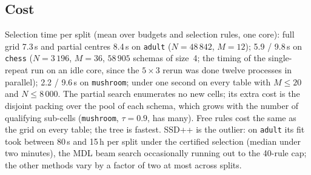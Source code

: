\documentclass[11pt]{article}
\begin{document}
\subsection{Cost}
Selection time per split (mean over budgets and selection rules, one core): full grid 7.3\,s and partial centres 8.4\,s on \texttt{adult} ($N=48\,842$, $M=12$); 5.9 / 9.8\,s on \texttt{chess} ($N=3\,196$, $M=36$, $58\,905$ schemas of size~4; the timing of the single-repeat run on an idle core, since the $5\times3$ rerun was done twelve processes in parallel); 2.2 / 9.6\,s on \texttt{mushroom}; under one second on every table with $M\le 20$ and $N\le 8\,000$. The partial search enumerates no new cells; its extra cost is the disjoint packing over the pool of each schema, which grows with the number of qualifying sub-cells (\texttt{mushroom}, $\tau=0.9$, has many). Free rules cost the same as the grid on every table; the tree is fastest. SSD++ is the outlier: on \texttt{adult} its fit took between 80\,s and 15\,h per split under the certified selection (median under two minutes), the MDL beam search occasionally running out to the 40-rule cap; the other methods vary by a factor of two at most across splits.
\end{document}
